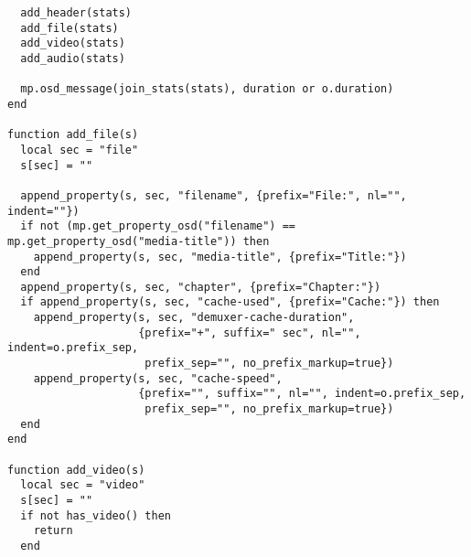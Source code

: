 \documentclass[11pt]{article}
\begin{document}
\begin{lstlisting}
  add_header(stats)
  add_file(stats)
  add_video(stats)
  add_audio(stats)

  mp.osd_message(join_stats(stats), duration or o.duration)
end

function add_file(s)
  local sec = "file"
  s[sec] = ""

  append_property(s, sec, "filename", {prefix="File:", nl="", indent=""})
  if not (mp.get_property_osd("filename") == mp.get_property_osd("media-title")) then
    append_property(s, sec, "media-title", {prefix="Title:"})
  end
  append_property(s, sec, "chapter", {prefix="Chapter:"})
  if append_property(s, sec, "cache-used", {prefix="Cache:"}) then
    append_property(s, sec, "demuxer-cache-duration",
                    {prefix="+", suffix=" sec", nl="", indent=o.prefix_sep,
                     prefix_sep="", no_prefix_markup=true})
    append_property(s, sec, "cache-speed",
                    {prefix="", suffix="", nl="", indent=o.prefix_sep,
                     prefix_sep="", no_prefix_markup=true})
  end
end

function add_video(s)
  local sec = "video"
  s[sec] = ""
  if not has_video() then
    return
  end


\end{lstlisting}
\end{document}

